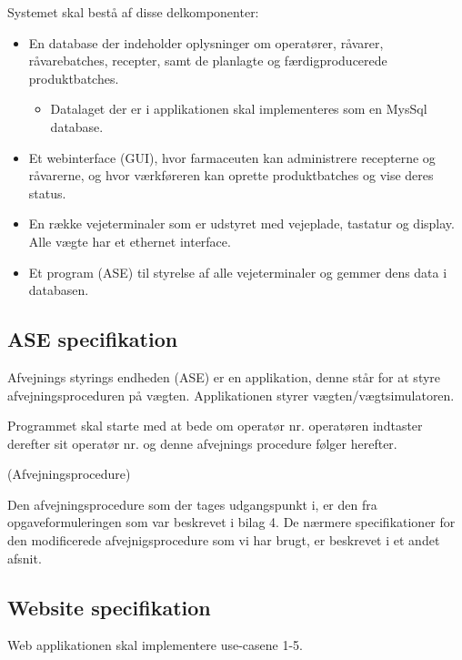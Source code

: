 \documentclass[a4paper]{article}
\begin{document}
Systemet skal bestå af disse delkomponenter:

\begin{itemize}
  \item En database der indeholder oplysninger om operatører, råvarer, råvarebatches, recepter, samt de planlagte og færdigproducerede produktbatches. 
    \begin{itemize}
      \item Datalaget der er i applikationen skal implementeres som en MysSql database.
    \end{itemize}
  \item Et webinterface (GUI), hvor farmaceuten kan administrere recepterne og råvarerne, og hvor værkføreren kan oprette produktbatches og vise deres status.
  \item En række vejeterminaler som er udstyret med vejeplade, tastatur og display. Alle vægte har et ethernet interface. 
  \item Et program (ASE) til styrelse af alle vejeterminaler og gemmer dens data i databasen.
\end{itemize}


\subsection{ASE specifikation} %

Afvejnings styrings endheden (ASE) er en applikation, denne står for at styre afvejningsproceduren på vægten. Applikationen styrer vægten/vægtsimulatoren. 

Programmet skal starte med at bede om operatør nr. operatøren indtaster derefter sit operatør nr. og denne afvejnings procedure følger herefter.

 (Afvejningsprocedure)

Den afvejningsprocedure som der tages udgangspunkt i, er den fra opgaveformuleringen som var beskrevet i bilag 4. De nærmere specifikationer for den modificerede afvejnigsprocedure som vi har brugt, er beskrevet i et andet afsnit. 


\subsection{Website specifikation} %

Web applikationen skal implementere use-casene 1-5.
\end{document}
